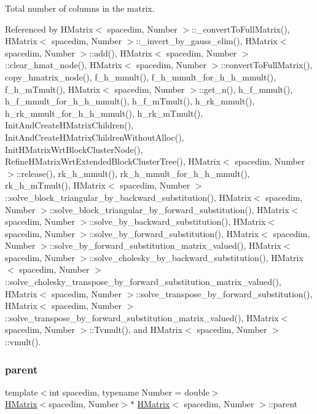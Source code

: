 Total number of columns in the matrix. 

Referenced by H\+Matrix$<$ spacedim, Number $>$\+::\+\_\+convert\+To\+Full\+Matrix(), H\+Matrix$<$ spacedim, Number $>$\+::\+\_\+invert\+\_\+by\+\_\+gauss\+\_\+elim(), H\+Matrix$<$ spacedim, Number $>$\+::add(), H\+Matrix$<$ spacedim, Number $>$\+::clear\+\_\+hmat\+\_\+node(), H\+Matrix$<$ spacedim, Number $>$\+::convert\+To\+Full\+Matrix(), copy\+\_\+hmatrix\+\_\+node(), f\+\_\+h\+\_\+mmult(), f\+\_\+h\+\_\+mmult\+\_\+for\+\_\+h\+\_\+h\+\_\+mmult(), f\+\_\+h\+\_\+m\+Tmult(), H\+Matrix$<$ spacedim, Number $>$\+::get\+\_\+n(), h\+\_\+f\+\_\+mmult(), h\+\_\+f\+\_\+mmult\+\_\+for\+\_\+h\+\_\+h\+\_\+mmult(), h\+\_\+f\+\_\+m\+Tmult(), h\+\_\+rk\+\_\+mmult(), h\+\_\+rk\+\_\+mmult\+\_\+for\+\_\+h\+\_\+h\+\_\+mmult(), h\+\_\+rk\+\_\+m\+Tmult(), Init\+And\+Create\+H\+Matrix\+Children(), Init\+And\+Create\+H\+Matrix\+Children\+Without\+Alloc(), Init\+H\+Matrix\+Wrt\+Block\+Cluster\+Node(), Refine\+H\+Matrix\+Wrt\+Extended\+Block\+Cluster\+Tree(), H\+Matrix$<$ spacedim, Number $>$\+::release(), rk\+\_\+h\+\_\+mmult(), rk\+\_\+h\+\_\+mmult\+\_\+for\+\_\+h\+\_\+h\+\_\+mmult(), rk\+\_\+h\+\_\+m\+Tmult(), H\+Matrix$<$ spacedim, Number $>$\+::solve\+\_\+block\+\_\+triangular\+\_\+by\+\_\+backward\+\_\+substitution(), H\+Matrix$<$ spacedim, Number $>$\+::solve\+\_\+block\+\_\+triangular\+\_\+by\+\_\+forward\+\_\+substitution(), H\+Matrix$<$ spacedim, Number $>$\+::solve\+\_\+by\+\_\+backward\+\_\+substitution(), H\+Matrix$<$ spacedim, Number $>$\+::solve\+\_\+by\+\_\+forward\+\_\+substitution(), H\+Matrix$<$ spacedim, Number $>$\+::solve\+\_\+by\+\_\+forward\+\_\+substitution\+\_\+matrix\+\_\+valued(), H\+Matrix$<$ spacedim, Number $>$\+::solve\+\_\+cholesky\+\_\+by\+\_\+backward\+\_\+substitution(), H\+Matrix$<$ spacedim, Number $>$\+::solve\+\_\+cholesky\+\_\+transpose\+\_\+by\+\_\+forward\+\_\+substitution\+\_\+matrix\+\_\+valued(), H\+Matrix$<$ spacedim, Number $>$\+::solve\+\_\+transpose\+\_\+by\+\_\+forward\+\_\+substitution(), H\+Matrix$<$ spacedim, Number $>$\+::solve\+\_\+transpose\+\_\+by\+\_\+forward\+\_\+substitution\+\_\+matrix\+\_\+valued(), H\+Matrix$<$ spacedim, Number $>$\+::\+Tvmult(), and H\+Matrix$<$ spacedim, Number $>$\+::vmult().

\mbox{\label{classHMatrix_a71690997092a4142799b2fa2dbf53db4}} 
\subsubsection{\texorpdfstring{parent}{parent}}
{\footnotesize\ttfamily template$<$int spacedim, typename Number = double$>$ \\
\hyperlink{classHMatrix}{H\+Matrix}$<$spacedim, Number$>$$\ast$ \hyperlink{classHMatrix}{H\+Matrix}$<$ spacedim, Number $>$\+::parent\hspace{0.3cm}{\ttfamily [private]}}

